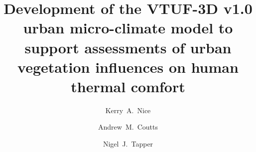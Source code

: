 \documentclass[final,3p,times,authoryear]{elsarticle}
\begin{document}
\begin{frontmatter}



\title{Development of the VTUF-3D v1.0 urban micro-climate model to support assessments of urban vegetation influences on human thermal comfort}


\author[monash,melb,crc]{Kerry~A.~Nice}
\author[monash,crc]{Andrew~M.~Coutts}
\author[monash,crc]{Nigel~J.~Tapper}
\address[monash]{School of Earth, Atmosphere and Environment, Monash University, Clayton, Victoria 3800, Australia}
\address[melb]{Transport, Health, and Urban Design, Faculty of Architecture, Building and Planning, University of Melbourne, Victoria 3010, Australia}
\address[crc]{Cooperative Research Centre for Water Sensitive Cities, Melbourne, Australia}


\begin{abstract}


\end{abstract}
\end{frontmatter}
\end{document}
